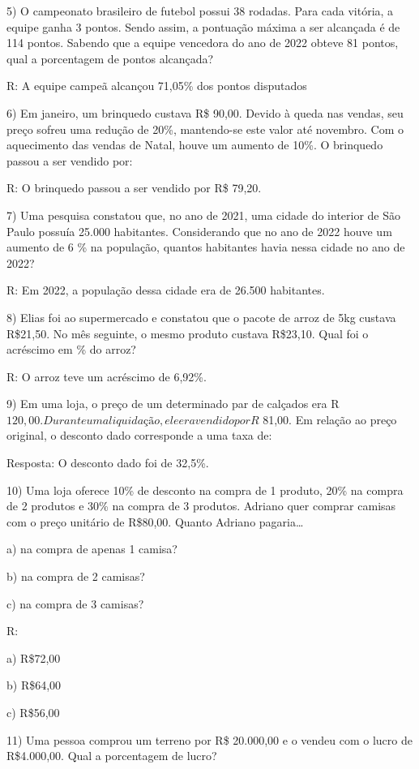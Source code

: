 5) O campeonato brasileiro de futebol possui 38 rodadas. Para cada
vitória, a equipe ganha 3 pontos. Sendo assim, a pontuação máxima a ser
alcançada é de 114 pontos. Sabendo que a equipe vencedora do ano de 2022
obteve 81 pontos, qual a porcentagem de pontos alcançada?

R: A equipe campeã alcançou 71,05\% dos pontos disputados

6) Em janeiro, um brinquedo custava R\$ 90,00. Devido à queda nas
vendas, seu preço sofreu uma redução de 20\%, mantendo-se este valor até
novembro. Com o aquecimento das vendas de Natal, houve um aumento de
10\%. O brinquedo passou a ser vendido por:

R: O brinquedo passou a ser vendido por R\$ 79,20.

7) Uma pesquisa constatou que, no ano de 2021, uma cidade do interior de
São Paulo possuía 25.000 habitantes. Considerando que no ano de 2022
houve um aumento de 6 \% na população, quantos habitantes havia nessa
cidade no ano de 2022?

R: Em 2022, a população dessa cidade era de 26.500 habitantes.

8) Elias foi ao supermercado e constatou que o pacote de arroz de 5kg
custava R\$21,50. No mês seguinte, o mesmo produto custava R\$23,10.
Qual foi o acréscimo em \% do arroz?

R: O arroz teve um acréscimo de 6,92\%.

9) Em uma loja, o preço de um determinado par de calçados era
R\(120,00. Durante uma liquidação, ele era vendido por R\) 81,00. Em
relação ao preço original, o desconto dado corresponde a uma taxa de:

Resposta: O desconto dado foi de 32,5\%.

10) Uma loja oferece 10\% de desconto na compra de 1 produto, 20\% na
compra de 2 produtos e 30\% na compra de 3 produtos. Adriano quer
comprar camisas com o preço unitário de R\$80,00. Quanto Adriano
pagaria\ldots{}

a) na compra de apenas 1 camisa?

b) na compra de 2 camisas?

c) na compra de 3 camisas?

R:

a) R\$72,00

b) R\$64,00

c) R\$56,00

11) Uma pessoa comprou um terreno por R\$ 20.000,00 e o vendeu com o
lucro de R\$4.000,00. Qual a porcentagem de lucro?

